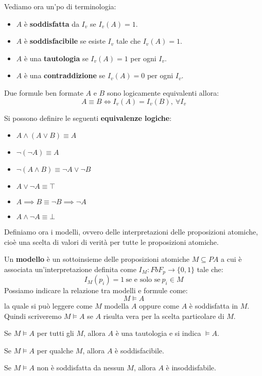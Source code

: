 Vediamo ora un'po di terminologia:
\begin{itemize}
    \item $A$ è \textbf{soddisfatta} da $I_v$ se $I_v(A) = 1$.
    \item $A$ è \textbf{soddisfacibile} se esiste $I_v$ tale che $I_v(A) = 1$.
    \item $A$ è una \textbf{tautologia} se $I_v(A) = 1$ per ogni $I_v$.
    \item $A$ è una \textbf{contraddizione} se $I_v(A) = 0$ per ogni $I_v$.
\end{itemize}
\begin{definizione}
    Due formule ben formate $A$ e $B$ sono logicamente equivalenti allora:
    \begin{equation}
        A \equiv B \iff I_v(A) = I_v(B), \ \forall I_v
    \end{equation}
\end{definizione}
Si possono definire le seguenti \textbf{equivalenze logiche}:
\begin{itemize}
    \item $A \land (A \lor B) \equiv A$
    \item $\lnot (\lnot A) \equiv A$
    \item $\lnot (A \land B) \equiv \lnot A \lor \lnot B$
    \item $A \lor \lnot A \equiv \top$
    \item $A \implies B \equiv \lnot B \implies \lnot A$
    \item $A \land \lnot A \equiv \bot$
\end{itemize}
Definiamo ora i modelli, ovvero delle interpretazioni delle proposizioni
atomiche, cioè una scelta di valori di verità per tutte le proposizioni atomiche.
\begin{definizione}
    Un \textbf{modello} è un sottoinsieme delle proposizioni atomiche $M
        \subseteq PA$ a cui è associata un'interpretazione definita come $I_M:
        FbF_p \to \{0, 1\}$ tale che:
    \begin{equation}
        I_M(p_i) = 1 \ \text{se e solo se} \ p_i \in M
    \end{equation}
    Possiamo indicare la relazione tra modelli e formule come:
    \begin{equation}
        M \models A
    \end{equation}
    la quale si può leggere come $M$ modella $A$ oppure come $A$ è soddisfatta
    in $M$. Quindi scriveremo $M \models A$ se $A$ risulta vera per la scelta
    particolare di $M$.
\end{definizione}
\begin{definizione}
    Se $M \models A$ per tutti gli $M$, allora $A$ è una tautologia e si indica
    $\models A$.
\end{definizione}
\begin{definizione}
    Se $M \models A$ per qualche $M$, allora $A$ è soddisfacibile.
\end{definizione}
\begin{definizione}
    Se $M \models A$ non è soddisfatta da nessun $M$, allora $A$ è insoddisfabile.
\end{definizione}
